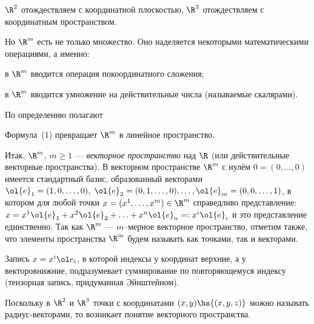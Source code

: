 \documentclass[a4paper]{article}
\newcommand{\emd}[1]{\emph{#1}}
\begin{document}
$\R^2$ отождествляем с координатной плоскостью, $\R^3$ отождествляем
с координатным пространством.

Но $\R^m$ есть не только множество. Оно наделяется некоторыми
математическими операциями, а именно:
\begin{nums}{-2}
\item в $\R^m$ вводится операция покоординатного сложения;
\item в $\R^m$ вводится умножение на действительные числа (называемые
скалярами).
\end{nums}

По определению полагают

Формула~(1) превращает $\R^m$ в линейное пространство.

Итак, $\R^m$, $m\ge 1$ --- \emd{векторное пространство}
над $\R$ (или действительные векторные пространства). В векторном
пространстве $\R^m$ с нулём $0=(0,\ldots,0)$ имеется стандартный
базис, образованный векторами $\ol{e}_1=(1,0,\ldots,0),\;
\ol{e}_2=(0,1,\ldots,0),\ldots,\ol{e}_m=(0,0,\ldots,1)$,
в котором для любой точки $x=(x^1,\ldots,x^m)\in \R^m$ справедливо
представление: $x=x^1 \ol{e}_1+x^2\ol{e}_2+\ldots + x^n
\ol{e}_n =: x^i \ol{e}_i$ и это представление
единственно. Так как $\R^m$ --- $m$--мерное векторное пространство,
отметим также, что элементы пространства $\R^m$ будем называть как
точками, так и векторами.

\begin{note}
Запись $x = x^i\ol e_i$, в которой индексы у координат верхние, а у векторов\т нижние, подразумевает
суммирование по повторяющемуся индексу (тензорная запись, придуманная Эйнштейном).
\end{note}

Поскольку в $\R^2$ и $\R^3$ точки с координатами $(x,y)\hs{(x,y,z)}$
можно называть радиус-векторами, то возникает понятие векторного
пространства.
\end{document}
